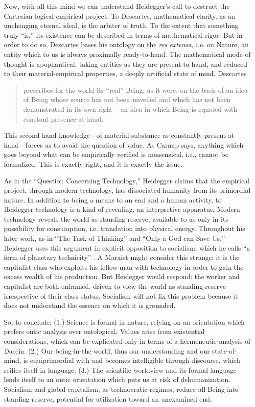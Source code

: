 \documentclass[leqno, 12pt]{turabian-researchpaper}
\begin{document}
	Now, with all this mind we can understand Heidegger's call to destruct the Cartesian
	logical-empirical project. To Descartes, mathematical clarity, as an
	unchanging eternal ideal, is the arbiter of truth. To the extent that
	something truly \enquote{is,} its existence can be described in terms of mathematical
	rigor. But in order to do so, Descartes bases his ontology on the \textit{res
	extensa,} i.e. on Nature, an entity which to us is always proximally ready-to-hand.
	The mathematical mode of thought is apophantical, taking entities as they are
	present-to-hand, and reduced to their material-empirical properties, a deeply
	artificial state of mind. Descartes \blockquote[{}]{prescribes for the world its \enquote{real} Being, as it were, on the basis of an idea of Being whose source has not been unveiled and which has not been demonstrated in its own right -- an idea in which Being is equated with constant presence-at-hand.}
	This second-hand knowledge - of material substance as constantly present-at-hand
	- forces us to avoid the question of value. As Carnap says, anything which goes
	beyond what can be empirically verified is nonsensical, i.e., cannot be
	formalized. This is exactly right, and it is exactly the issue.

	As in the \enquote{Question Concerning Technology,} \nocite{heidegger2008c}
	Heidegger claims that the empirical project, through modern technology, has
	dissociated humanity from its primordial nature. In addition to being a means to
	an end and a human activity, to Heidegger technology is a kind of revealing, an
	interpretive apparatus. Modern technology reveals the world as standing-reserve,
	available to us only in its possibility for consumption, i.e. translation into
	physical energy. Throughout his later work, as in \enquote{The Task of Thinking}\nocite{heidegger2008d}
	and \enquote{Only a God can Save Us,} Heidegger uses this argument in explicit
	opposition to socialism, which he calls \enquote{a form of planetary technicity}
	\autocite[206]{heidegger1981}. A Marxist might consider this strange: it is the
	capitalist class who exploits his fellow-man with technology in order to gain the
	excess wealth of his production. But Heidegger would respond: the worker and capitalist
	are both enframed, driven to view the world as standing-reserve irrespective
	of their class status. Socialism will not fix this problem because it does not
	understand the essence on which it is grounded.

	So, to conclude: (1.) Science is formal in nature, relying on an orientation
	which prefers ontic analysis over ontological. Values arise from existential considerations,
	which can be explicated only in terms of a hermeneutic analysis of Dasein. (2.)
	Our being-in-the-world, thus our understanding and our state-of-mind, is equiprimordial
	with and becomes intelligible through discourse, which reifies itself in
	language. (3.) The scientific worldview and its formal language lends itself to
	an ontic orientation which puts us at risk of dehumanization. Socialism and
	global capitalism, as technocratic regimes, reduce all Being into standing-reserve,
	potential for utilization toward an unexamined end.
\end{document}
